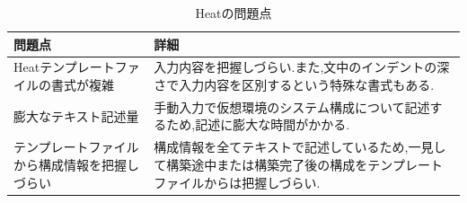 \documentclass[mingoth]{kut-paper}		%
\begin{document}
	\begin{table}[H]
		\begin{center}
			\caption{Heatの問題点}
			\label{table:2}
			\begin{tabular}{|p{5cm}|p{7cm}|}\hline
				問題点 & 詳細\\ \hline \hline
				Heatテンプレートファイルの書式が複雑 & 入力内容を把握しづらい.また,文中のインデントの深さで入力内容を区別するという特殊な書式もある.\\ \hline
				膨大なテキスト記述量 & 手動入力で仮想環境のシステム構成について記述するため,記述に膨大な時間がかかる.\\ \hline
				テンプレートファイルから構成情報を把握しづらい & 構成情報を全てテキストで記述しているため,一見して構築途中または構築完了後の構成をテンプレートファイルからは把握しづらい.\\ \hline
			\end{tabular}
		\end{center}
	\end{table}
\end{document}
